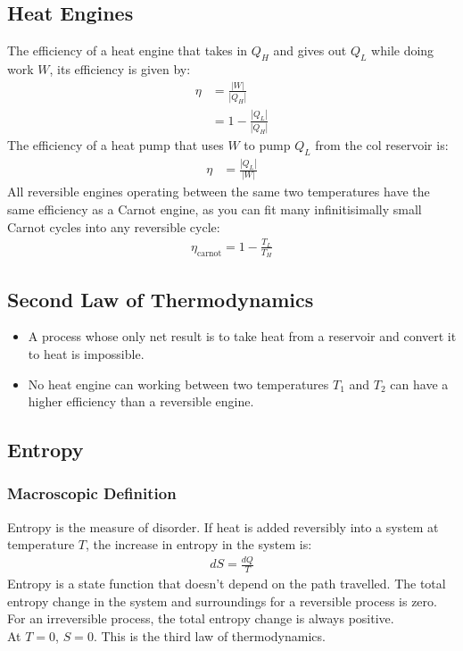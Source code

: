 \documentclass[a4paper]{article}
\begin{document}
\begin{multicols*}{2}
\subsection{Heat Engines}
The efficiency of a heat engine that takes in $Q_H$ and gives out $Q_L$ while
doing work $W$, its efficiency is given by:
\begin{align*}
  \eta &= \frac{|W|}{|Q_H|} \\
  &= 1 - \frac{|Q_L|}{|Q_H|}
\end{align*}
The efficiency of a heat pump that uses $W$ to pump $Q_L$ from the col reservoir
is:
\begin{align*}
  \eta &= \frac{|Q_L|}{|W|}
\end{align*}
All reversible engines operating between the same two temperatures have the same
efficiency as a Carnot engine, as you can fit many infinitisimally small Carnot
cycles into any reversible cycle:
\begin{align*}
  \eta_{\text{carnot}} = 1 - \frac{T_L}{T_H}
\end{align*}
\subsection{Second Law of Thermodynamics}
\begin{itemize}
\item A process whose only net result is to take heat from a reservoir and
  convert it to heat is impossible.
\item No heat engine can working between two temperatures $T_1$ and $T_2$ can
  have a higher efficiency than a reversible engine.
\end{itemize}
\subsection{Entropy}
\subsubsection{Macroscopic Definition}
Entropy is the measure of disorder. If heat is added reversibly into a system at
temperature $T$, the increase in entropy in the system is:
\begin{align*}
  dS = \frac{dQ}{T}
\end{align*}
Entropy is a state function that doesn't depend on the path travelled. The total
entropy change in the system and surroundings for a reversible process is
zero. For an irreversible process, the total entropy change is always positive.
\\
\noindent
At $T=0$, $S=0$. This is the third law of thermodynamics.

\end{multicols*}
\end{document}
